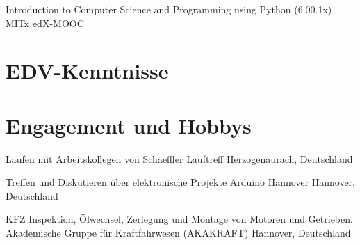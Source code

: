 \documentclass[11pt,a4paper,sans]{moderncv}
\begin{document}
{Introduction to Computer Science and Programming using Python (6.00.1x)}
{MITx}
{edX-MOOC}
{}
{}



\section{\textbf{EDV-Kenntnisse}}





\section{\textbf{Engagement und Hobbys}}

{
Laufen mit Arbeitskollegen von Schaeffler
}
{Lauftreff}
{Herzogenaurach, Deutschland}
{}
{}

{
Treffen und Diskutieren über elektronische Projekte
}
{Arduino Hannover}
{Hannover, Deutschland}
{}
{}

{
KFZ Inspektion, Ölwechsel, Zerlegung und Montage von Motoren und Getrieben.
}
{Akademische Gruppe für Kraftfahrwesen (AKAKRAFT)}
{Hannover, Deutschland}
{}
{}
\end{document}
